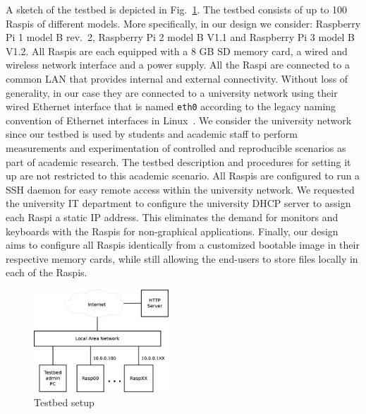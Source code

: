 \label{sec:overview}

A sketch of the testbed is depicted in Fig.~\ref{fig:testbed_setup}.
The testbed consists of up to 100 \ac{Raspi}s of different models.
More specifically, in our design we consider: Raspberry Pi 1 model B rev.~2,
Raspberry Pi 2 model B V1.1 and Raspberry Pi 3 model B V1.2.
All \ac{Raspi}s are each equipped with a 8 GB \ac{SD} memory card, a wired and wireless
network interface and a power supply. All the \ac{Raspi} are connected to
a common \ac{LAN} that provides internal and external connectivity. Without
loss of generality, in our case they are connected to a university network
using their wired Ethernet interface that is named \texttt{eth0} according
to the legacy naming convention of Ethernet interfaces in
Linux~\cite{PredictableNetworkInterfaceNames}. We consider the
university network since our testbed is used by students and academic staff
to perform measurements and experimentation of controlled and
reproducible scenarios as part of academic research. The
testbed description and procedures for setting it up are not restricted
to this academic scenario. All \ac{Raspi}s are configured to run
a \ac{SSH} daemon for easy remote access within the university network.
We requested the university \ac{IT} department to configure the university
\ac{DHCP} server to assign each \ac{Raspi} a static \ac{IP} address. This
eliminates the demand for monitors and keyboards with the \ac{Raspi}s
for non-graphical applications. Finally, our design aims to configure all
\ac{Raspi}s identically from a customized bootable image in their
respective memory cards, while still allowing the end-users to store
files locally in each of the \ac{Raspi}s.

\begin{figure}[ht!]
\centering
\includegraphics[width=0.45\textwidth]{images/testbed_setup3.eps}
\caption{Testbed setup}
\label{fig:testbed_setup}
\end{figure}


